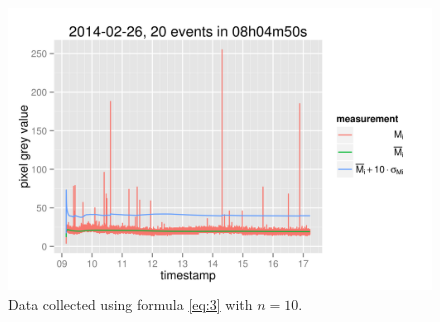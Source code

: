 \documentclass[a4paper,12pt]{article}
\begin{document}
\begin{figure}[h!]
  \centering
  \includegraphics{20140226.png}
  \caption{Data collected using formula \ref{eq:3} with $n=10$.}\label{fig:2}
\end{figure}
\end{document}
